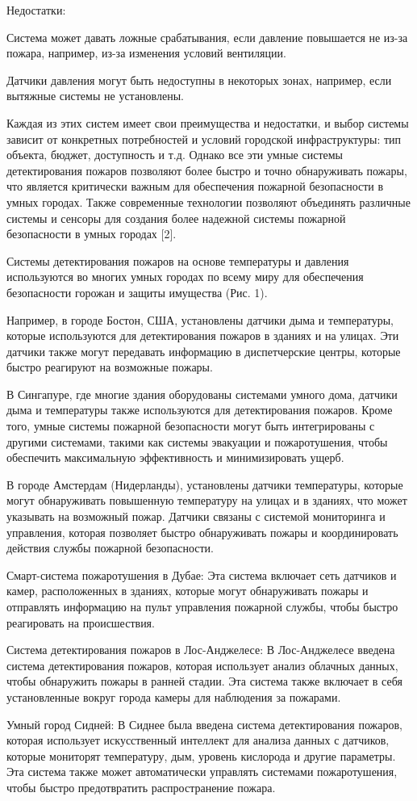 \begin{multicols}{2}
Недостатки:

Система может давать ложные срабатывания, если давление повышается не
из-за пожара, например, из-за изменения условий вентиляции.

Датчики давления могут быть недоступны в некоторых зонах, например,
если вытяжные системы не установлены.

Каждая из этих систем имеет свои преимущества и недостатки, и выбор
системы зависит от конкретных потребностей и условий городской
инфраструктуры: тип объекта, бюджет, доступность и т.д. Однако все эти
умные системы детектирования пожаров позволяют более быстро и точно
обнаруживать пожары, что является критически важным для обеспечения
пожарной безопасности в умных городах. Также современные технологии
позволяют объединять различные системы и сенсоры для создания более
надежной системы пожарной безопасности в умных городах {[}2{]}.

Системы детектирования пожаров на основе температуры и давления
используются во многих умных городах по всему миру для обеспечения
безопасности горожан и защиты имущества (Рис. 1).

Например, в городе Бостон, США, установлены датчики дыма и
температуры, которые используются для детектирования пожаров в зданиях
и на улицах. Эти датчики также могут передавать информацию в
диспетчерские центры, которые быстро реагируют на возможные пожары.

В Сингапуре, где многие здания оборудованы системами умного дома,
датчики дыма и температуры также используются для детектирования
пожаров. Кроме того, умные системы пожарной безопасности могут быть
интегрированы с другими системами, такими как системы эвакуации и
пожаротушения, чтобы обеспечить максимальную эффективность и
минимизировать ущерб.

В городе Амстердам (Нидерланды), установлены датчики температуры,
которые могут обнаруживать повышенную температуру на улицах и в
зданиях, что может указывать на возможный пожар. Датчики связаны с
системой мониторинга и управления, которая позволяет быстро
обнаруживать пожары и координировать действия службы пожарной
безопасности.

Смарт-система пожаротушения в Дубае: Эта система включает сеть
датчиков и камер, расположенных в зданиях, которые могут обнаруживать
пожары и отправлять информацию на пульт управления пожарной службы,
чтобы быстро реагировать на происшествия.

Система детектирования пожаров в Лос-Анджелесе: В Лос-Анджелесе
введена система детектирования пожаров, которая использует анализ
облачных данных, чтобы обнаружить пожары в ранней стадии. Эта система
также включает в себя установленные вокруг города камеры для
наблюдения за пожарами.

Умный город Сидней: В Сиднее была введена система детектирования
пожаров, которая использует искусственный интеллект для анализа данных
с датчиков, которые мониторят температуру, дым, уровень кислорода и
другие параметры. Эта система также может автоматически управлять
системами пожаротушения, чтобы быстро предотвратить распространение
пожара.
\end{multicols}

